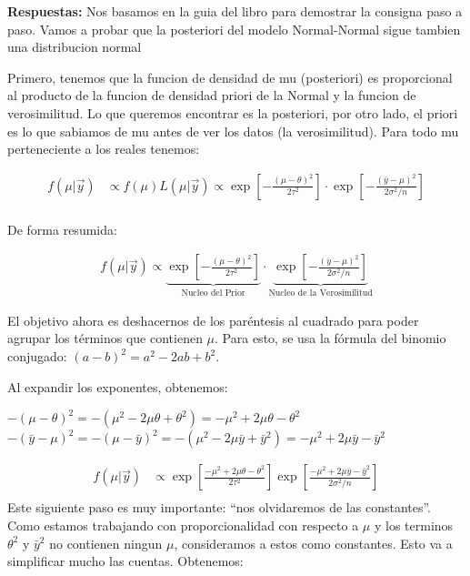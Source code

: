 \documentclass[
  letterpaper,
  DIV=11,
  numbers=noendperiod]{scrartcl}
\begin{document}
\textbf{Respuestas:} Nos basamos en la guia del libro para demostrar la
consigna paso a paso. Vamos a probar que la posteriori del modelo
Normal-Normal sigue tambien una distribucion normal

Primero, tenemos que la funcion de densidad de mu (posteriori) es
proporcional al producto de la funcion de densidad priori de la Normal y
la funcion de verosimilitud. Lo que queremos encontrar es la posteriori,
por otro lado, el priori es lo que sabiamos de mu antes de ver los datos
(la verosimilitud). Para todo mu perteneciente a los reales tenemos:

\[
\begin{aligned}
f(\mu|\vec{y}) &\propto f(\mu)L(\mu|\vec{y}) \propto \exp\left[-\frac{(\mu-\theta)^2}{2\tau^2}\right] \cdot \exp\left[-\frac{(\bar{y}-\mu)^2}{2\sigma^2/n}\right] \\[2ex]
\end{aligned}
\]

De forma resumida:

\[
\begin{align*}
f(\mu|\vec{y}) \propto \underbrace{\exp\left[-\frac{(\mu-\theta)^2}{2\tau^2}\right]}_{\text{Nucleo del Prior}} \cdot \underbrace{\exp\left[-\frac{(\bar{y}-\mu)^2}{2\sigma^2/n}\right]}_{\text{Nucleo de la Verosimilitud}}
\end{align*}
\]

El objetivo ahora es deshacernos de los paréntesis al cuadrado para
poder agrupar los términos que contienen \(\mu\). Para esto, se usa la
fórmula del binomio conjugado: \((a-b)^2 = a^2 - 2ab + b^2\).

Al expandir los exponentes, obtenemos:

\(-(\mu - \theta)^2 = -(\mu^2 - 2\mu\theta + \theta^2) = -\mu^2 + 2\mu\theta - \theta^2\)
\(-(\bar{y} - \mu)^2 = -(\mu - \bar{y})^2 = -(\mu^2 - 2\mu\bar{y} + \bar{y}^2) = -\mu^2 + 2\mu\bar{y} - \bar{y}^2\)

\[
\begin{aligned}
f(\mu|\vec{y}) &\propto \exp\left[\frac{-\mu^2 + 2\mu\theta - \theta^2}{2\tau^2}\right] \exp\left[\frac{-\mu^2 + 2\mu\bar{y} - \bar{y}^2}{2\sigma^2/n}\right] \\
\end{aligned}
\] Este siguiente paso es muy importante: ``nos olvidaremos de las
constantes''. Como estamos trabajando con proporcionalidad con respecto
a \(\mu\) y los terminos \(\theta^2\) y \(\bar{y}^2\) no contienen
ningun \(\mu\), consideramos a estos como constantes. Esto va a
simplificar mucho las cuentas. Obtenemos:
\end{document}
